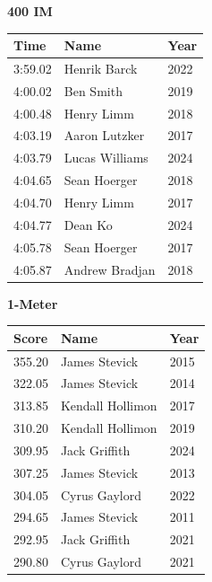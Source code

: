 \hfill
\begin{minipage}[t]{0.48\textwidth}
\centering
\textbf{\textcolor{teamprimary}{400 IM}}\par
\vspace{0.5em}
\centering
\small
\renewcommand{\arraystretch}{1.0}
\setlength{\tabcolsep}{4pt}
\begin{tabular}{@{}p{1.8cm}p{3.0cm}p{1.0cm}@{}}
\toprule
\textbf{Time} & \textbf{Name} & \textbf{Year} \\
\midrule
3:59.02 & Henrik Barck & 2022 \\
4:00.02 & Ben Smith & 2019 \\
4:00.48 & Henry Limm & 2018 \\
4:03.19 & Aaron Lutzker & 2017 \\
4:03.79 & Lucas Williams & 2024 \\
4:04.65 & Sean Hoerger & 2018 \\
4:04.70 & Henry Limm & 2017 \\
4:04.77 & Dean Ko & 2024 \\
4:05.78 & Sean Hoerger & 2017 \\
4:05.87 & Andrew Bradjan & 2018 \\
\bottomrule
\end{tabular}
\end{minipage}
\vspace{1.2em}
\noindent\begin{minipage}[t]{0.48\textwidth}
\centering
\textbf{\textcolor{teamprimary}{1-Meter}}\par
\vspace{0.5em}
\centering
\small
\renewcommand{\arraystretch}{1.0}
\setlength{\tabcolsep}{4pt}
\begin{tabular}{@{}p{1.8cm}p{3.0cm}p{1.0cm}@{}}
\toprule
\textbf{Score} & \textbf{Name} & \textbf{Year} \\
\midrule
355.20 & James Stevick & 2015 \\
322.05 & James Stevick & 2014 \\
313.85 & Kendall Hollimon & 2017 \\
310.20 & Kendall Hollimon & 2019 \\
309.95 & Jack Griffith & 2024 \\
307.25 & James Stevick & 2013 \\
304.05 & Cyrus Gaylord & 2022 \\
294.65 & James Stevick & 2011 \\
292.95 & Jack Griffith & 2021 \\
290.80 & Cyrus Gaylord & 2021 \\
\bottomrule
\end{tabular}
\end{minipage}
